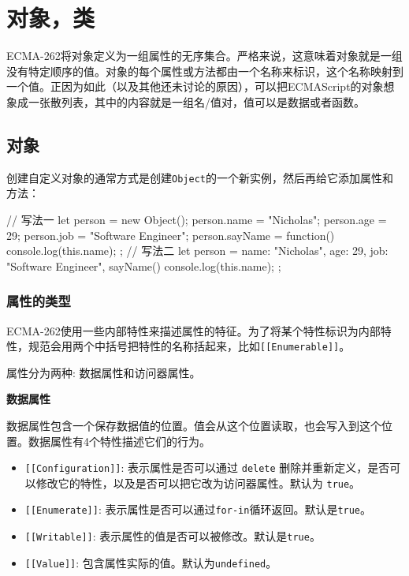 \section{对象，类}

ECMA-262将对象定义为一组属性的无序集合。严格来说，这意味着对象就是一组没有特定顺序的值。对象的每个属性或方法都由一个名称来标识，这个名称映射到一个值。正因为如此（以及其他还未讨论的原因），可以把ECMAScript的对象想象成一张散列表，其中的内容就是一组名/值对，值可以是数据或者函数。

\subsection{对象}

创建自定义对象的通常方式是创建\texttt{Object}的一个新实例，然后再给它添加属性和方法：

\begin{JavaScript}
// 写法一
let person = new Object(); 
person.name = "Nicholas"; 
person.age = 29; 
person.job = "Software Engineer"; 
person.sayName = function() {   
    console.log(this.name);  
}; 
// 写法二
let person = {    
    name: "Nicholas",   
    age: 29,   
    job: "Software Engineer",   
    sayName() {     
        console.log(this.name);   
    } 
};
\end{JavaScript}

\subsubsection{属性的类型}

ECMA-262使用一些内部特性来描述属性的特征。为了将某个特性标识为内部特性，规范会用两个中括号把特性的名称括起来，比如\texttt{[[Enumerable]]}。

属性分为两种: 数据属性和访问器属性。

\noindent\textbf{数据属性}

数据属性包含一个保存数据值的位置。值会从这个位置读取，也会写入到这个位置。数据属性有4个特性描述它们的行为。

\begin{itemize}
    \item \texttt{[[Configuration]]}: 表示属性是否可以通过 \texttt{delete} 删除并重新定义，是否可以修改它的特性，以及是否可以把它改为访问器属性。默认为 \texttt{true}。
    \item \texttt{[[Enumerate]]}: 表示属性是否可以通过\texttt{for-in}循环返回。默认是\texttt{true}。
    \item \texttt{[[Writable]]}: 表示属性的值是否可以被修改。默认是\texttt{true}。
    \item \texttt{[[Value]]}: 包含属性实际的值。默认为\texttt{undefined}。
\end{itemize}

